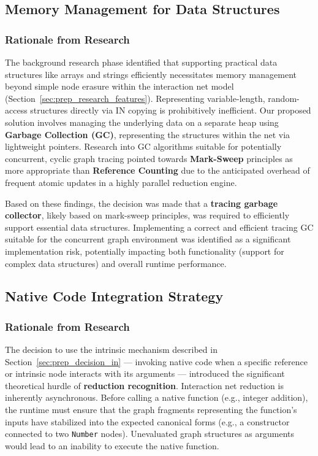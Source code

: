 \subsection{Memory Management for Data Structures}\label{sec:prep_decision_mem}

\subsubsection*{Rationale from Research}
The background research phase identified that supporting practical data structures like arrays and strings efficiently necessitates memory management beyond simple node erasure within the interaction net model (Section~\ref{sec:prep_research_features}). Representing variable-length, random-access structures directly via IN copying is prohibitively inefficient. Our proposed solution involves managing the underlying data on a separate heap using \textbf{Garbage Collection (GC)}, representing the structures within the net via lightweight pointers. Research into GC algorithms suitable for potentially concurrent, cyclic graph tracing pointed towards \textbf{Mark-Sweep} principles as more appropriate than \textbf{Reference Counting} due to the anticipated overhead of frequent atomic updates in a highly parallel reduction engine.

Based on these findings, the decision was made that a \textbf{tracing garbage collector}, likely based on mark-sweep principles, was required to efficiently support essential data structures. Implementing a correct and efficient tracing GC suitable for the concurrent graph environment was identified as a significant implementation risk, potentially impacting both functionality (support for complex data structures) and overall runtime performance.

\subsection{Native Code Integration Strategy}\label{sec:prep_decision_native}

\subsubsection*{Rationale from Research}
The decision to use the intrinsic mechanism described in Section~\ref{sec:prep_decision_in} --- invoking native code when a specific reference or intrinsic node interacts with its arguments --- introduced the significant theoretical hurdle of \textbf{reduction recognition}. Interaction net reduction is inherently asynchronous. Before calling a native function (e.g., integer addition), the runtime must ensure that the graph fragments representing the function's inputs have stabilized into the expected canonical forms (e.g., a constructor connected to two \texttt{Number} nodes). Unevaluated graph structures as arguments would lead to an inability to execute the native function.

